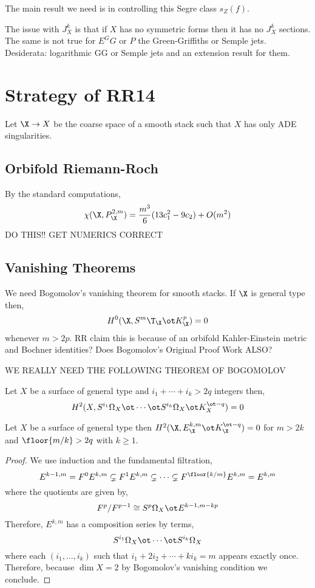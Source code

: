\documentclass[12pt]{article}
\begin{document}
The main result we need is in controlling this Segre class $s_Z(f)$.


The issue with $J^k_X$ is that if $X$ has no symmetric forms then it has no $J^k_X$ sections. The same is not true for $E^GG$ or $P$ the Green-Griffiths or Semple jets.
\bigskip\\
Desiderata: logarithmic GG or Semple jets and an extension result for them. 

\section{Strategy of RR14}

Let $\X \to X$ be the coarse space of a smooth stack such that $X$ has only ADE singularities. 

\subsection{Orbifold Riemann-Roch}

By the standard computations,
\[ \chi(\X, P^{2,m}_\X) = \frac{m^3}{6} (13 c_1^2 -  9 c_2) + O(m^2) \]
{\color{red} DO THIS!! GET NUMERICS CORRECT}

\subsection{Vanishing Theorems}

We need Bogomolov's vanishing theorem for smooth stacks. If $\X$ is general type then,
\[ H^0(\X, S^m \T_{\X} \ot K_{\X}^p) = 0 \]
whenever $m > 2 p$. {\color{red} RR claim this is because of an orbifold Kahler-Einstein metric and Bochner identities? Does Bogomolov's Original Proof Work ALSO?}

{\color{red} WE REALLY NEED THE FOLLOWING THEOREM OF BOGOMOLOV}

\begin{theorem}[Bogomolov]
Let $X$ be a surface of general type and $i_1 + \cdots + i_k > 2q$ integers then,
\[ H^2(X, S^{i_1} \Omega_X \ot \cdots \ot S^{i_k} \Omega_X \ot K_X^{\ot -q}) = 0 \]
\end{theorem}

\begin{prop}
Let $X$ be a surface of general type then $H^2(\X, E^{k,m}_{\X} \ot K_{\X}^{\ot -q}) = 0$ for $m > 2k$ and $\floor{m/k} > 2 q$ with $k \ge 1$.
\end{prop}


\begin{proof}
We use induction and the fundamental filtration,
\[ E^{k-1,m} = F^0 E^{k,m} \subsetneq F^1 E^{k,m} \subsetneq \cdots \subsetneq F^{\floor{k/m}} E^{k,m} = E^{k,m} \]  
where the quotients are given by,
\[ F^p / F^{p-1} \cong S^p \Omega_X \ot E^{k-1, m-kp} \]
Therefore, $E^{k,m}$ has a composition series by terms,
\[ S^{i_1} \Omega_X \ot \cdots \ot S^{i_k} \Omega_X \]
where each $(i_1, \dots, i_k)$ such that $i_1 + 2 i_2 + \cdots + k i_k = m$ appears exactly once. Therefore, because $\dim{X} = 2$ by Bogomolov's vanishing condition we conclude. 
\end{proof}
\end{document}
